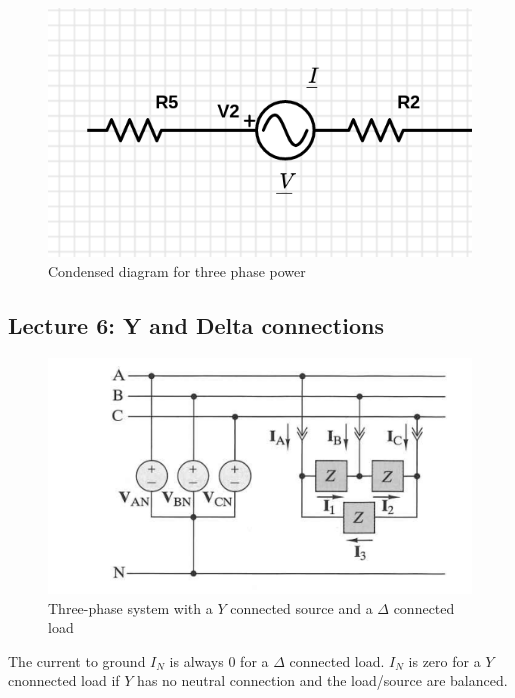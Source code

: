 \documentclass[../notes.tex]{subfiles}
\begin{document}
\begin{figure}[H]
	\centering
	\includegraphics[width=0.8\linewidth]{img/image_2022-09-18-02-35-24.png}
	\caption{Condensed diagram for three phase power}
\end{figure}


\subsection{Lecture 6: Y and Delta connections }

\begin{figure}[H]
	\centering
	\includegraphics[width=0.8\linewidth]{img/image_2022-09-19-11-25-58.png}
	\caption{Three-phase system with a $ Y $ connected source and a $ \Delta $ connected load}
\end{figure}

The current to ground $ I_N $ is always $ 0 $ for a $ \Delta $ connected load. $ I_N $ is zero for a $ Y $ cnonnected load if $ Y $ has no neutral connection and the load/source are balanced.
\end{document}
